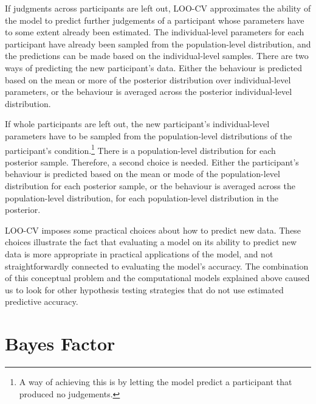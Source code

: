 \documentclass[a4paper,12pt,twoside]{article}
\begin{document}
If judgments across participants are left out, LOO-CV approximates the ability of the model to predict further judgements of a participant whose parameters have to some extent already been estimated. The individual-level parameters for each participant have already been sampled from the population-level distribution, and the predictions can be made based on the individual-level samples. There are two ways of predicting the new participant's data. Either the behaviour is predicted based on the mean or more of the posterior distribution over individual-level parameters, or the behaviour is averaged across the posterior individual-level distribution.

If whole participants are left out, the new participant's individual-level parameters have to be sampled from the population-level distributions of the participant's condition.\footnote{A way of achieving this is by letting the model predict a participant that produced no judgements.} There is a population-level distribution for each posterior sample. Therefore, a second choice is needed. Either the participant's behaviour is predicted based on the mean or mode of the population-level distribution for each posterior sample, or the behaviour is averaged across the population-level distribution, for each population-level distribution in the posterior.

LOO-CV imposes some practical choices about how to predict new data. These choices illustrate the fact that evaluating a model on its ability to predict new data is more appropriate in practical applications of the model, and not straightforwardly connected to evaluating the model's accuracy. The combination of this conceptual problem and the computational models explained above caused us to look for other hypothesis testing strategies that do not use estimated predictive accuracy.

\section{Bayes Factor}\label{sec:bayesFactor}
\end{document}
